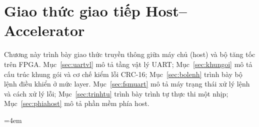 \chapter{Giao thức giao tiếp Host--Accelerator}\label{ch:uart}

Chương này trình bày giao thức truyền thông giữa máy chủ (host) và bộ tăng tốc trên FPGA.
Mục~\ref{sec:uartvl} mô tả tầng vật lý UART; Mục~\ref{sec:khungoi} mô tả cấu trúc khung gói và cơ chế kiểm lỗi CRC-16; Mục~\ref{sec:bolenh} trình bày bộ lệnh điều khiển ở mức layer.
Mục~\ref{sec:fsmuart} mô tả máy trạng thái xử lý lệnh và cách xử lý lỗi; Mục~\ref{sec:trinhtu} trình bày trình tự thực thi một nhịp; Mục~\ref{sec:phiahost} mô tả phần mềm phía host.

{\emergencystretch=4em






}
